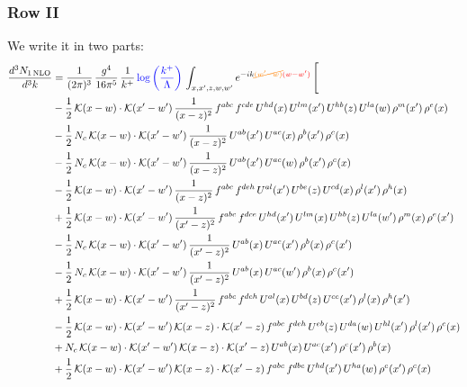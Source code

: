 \documentclass[9pt]{article}
\numberwithin{equation}{section}
\begin{document}
\subsubsection{Row II}
We write it in two parts:
\begin{align}
\frac{d^{3}N_{1\,\mathrm{NLO}}}{d^{3}k} & = \frac{1}{(2\pi)^{3}}\,\frac{g^{4}}{16\pi^{5}}\,\frac{1}{k^{+}}\,{\color{blue}\log{\left(\frac{k^{+}}{\Lambda}\right)}}\,\int_{x,x',z,w,w'}e^{-ik{\color{orange}\cancel{(w'-w)}}{\color{red}(w-w')}}\,\Bigg[\notag\\ & -\frac{1}{2}\,\mathcal{K}(x-w)\cdot\mathcal{K}(x'-w')\,\frac{1}{(x-z)^{2}}\,f^{abc}\,f^{cde}\,U^{hd}(x)\,U^{lm}(x')\,U^{hb}(z)\,U^{la}(w)\,\rho^{m}(x')\,\rho^{e}(x)\notag\\
& -\frac{1}{2}\,N_{c}\,\mathcal{K}(x-w)\cdot\mathcal{K}(x'-w')\,\frac{1}{(x-z)^{2}}\,U^{ab}(x')\,U^{ac}(x)\,\rho^{b}(x')\,\rho^{c}(x)\notag\\
& -\frac{1}{2}\,N_{c}\,\mathcal{K}(x-w)\cdot\mathcal{K}(x'-w')\,\frac{1}{(x-z)^{2}}\,U^{ab}(x')\,U^{ac}(w)\,\rho^{b}(x')\,\rho^{c}(x)\notag\\
& -\frac{1}{2}\,\mathcal{K}(x-w)\cdot\mathcal{K}(x'-w')\,\frac{1}{(x-z)^{2}}\,f^{abc}\,f^{deh}\,U^{al}(x')\,U^{be}(z)\,U^{cd}(x)\,\rho^{l}(x')\,\rho^{h}(x)\notag\\
& +\frac{1}{2}\,\mathcal{K}(x-w)\cdot\mathcal{K}(x'-w')\,\frac{1}{(x'-z)^{2}}\,f^{abc}\,f^{dce}\,U^{hd}(x')\,U^{lm}(x)\,U^{hb}(z)\,U^{la}(w')\,\rho^{m}(x)\,\rho^{e}(x')\notag\\
& -\frac{1}{2}\,N_{c}\,\mathcal{K}(x-w)\cdot\mathcal{K}(x'-w')\,\frac{1}{(x'-z)^{2}}\,U^{ab}(x)\,U^{ac}(x')\,\rho^{b}(x)\,\rho^{c}(x')\notag\\
& -\frac{1}{2}\,N_{c}\,\mathcal{K}(x-w)\cdot\mathcal{K}(x'-w')\,\frac{1}{(x'-z)^{2}}\,U^{ab}(x)\,U^{ac}(w')\,\rho^{b}(x)\,\rho^{c}(x')\notag\\
& +\frac{1}{2}\,\mathcal{K}(x-w)\cdot\mathcal{K}(x'-w')\,\frac{1}{(x'-z)^{2}}\,f^{abc}\,f^{deh}\,U^{al}(x)\,U^{bd}(z)\,U^{ce}(x')\,\rho^{l}(x)\,\rho^{h}(x')\notag\\
& -\frac{1}{2}\,\mathcal{K}(x-w)\cdot\mathcal{K}(x'-w')\,\mathcal{K}(x-z)\cdot\mathcal{K}(x'-z)\,f^{abc}\,f^{deh}\,U^{eb}(z)\,U^{da}(w)\,U^{hl}(x')\,\rho^{l}(x')\,\rho^{c}(x)\notag\\
& +N_{c}\,\mathcal{K}(x-w)\cdot\mathcal{K}(x'-w')\,\mathcal{K}(x-z)\cdot\mathcal{K}(x'-z)\,U^{ab}(x)\,U^{ac}(x')\,\rho^{c}(x')\,\rho^{b}(x)\notag\\
& +\frac{1}{2}\,\mathcal{K}(x-w)\cdot\mathcal{K}(x'-w')\,\mathcal{K}(x-z)\cdot\mathcal{K}(x'-z)\,f^{abc}\,f^{dbe}\,U^{hd}(x')\,U^{ha}(w)\,\rho^{e}(x')\,\rho^{c}(x)\notag\\

\end{align}
\end{document}
